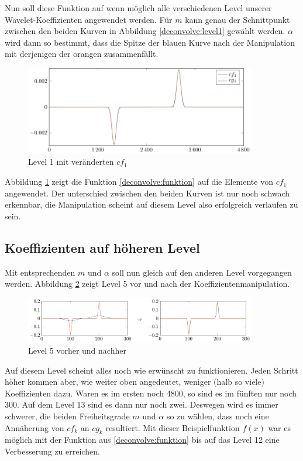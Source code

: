 Nun soll diese Funktion auf wenn möglich alle verschiedenen Level unserer Wavelet-Koeffizienten angewendet werden.
Für $m$ kann genau der Schnittpunkt zwischen den beiden Kurven in Abbildung \ref{deconvolve:level1} gewählt werden.
$\alpha$ wird dann so bestimmt, dass die Spitze der blauen Kurve nach der Manipulation mit derjenigen der orangen zusammenfällt.
\begin{figure}[h]
\centering
\includegraphics[width=0.9\textwidth]{./papers/deconvolve/pictures/level/level1_n.pdf}
\caption{Level 1 mit veränderten $cf_1$\label{deconvolve:level1_n}}
\end{figure}

Abbildung \ref{deconvolve:level1_n} zeigt die Funktion \eqref{deconvolve:funktion} auf die Elemente von $cf_1$ angewendet.
Der unterschied zwischen den beiden Kurven ist nur noch schwach erkennbar, die Manipulation scheint auf diesem Level also erfolgreich verlaufen zu sein.

\subsection{Koeffizienten auf höheren Level}

Mit entsprechenden $m$ und $\alpha$ soll nun gleich auf den anderen Level vorgegangen werden.
Abbildung \ref{deconvolve:level5} zeigt Level 5 vor und nach der Koeffizientenmanipulation.
\begin{figure}[h]
\centering
\includegraphics[width=0.9\textwidth]{./papers/deconvolve/pictures/level/level5.pdf}
\caption{Level 5 vorher und nachher\label{deconvolve:level5}}
\end{figure}

Auf diesem Level scheint alles noch wie erwünscht zu funktionieren.
Jeden Schritt höher kommen aber, wie weiter oben angedeutet, weniger (halb so viele) Koeffizienten dazu.
Waren es im ersten noch 4800, so sind es im fünften nur noch 300.
Auf dem Level 13 sind es dann nur noch zwei.
Deswegen wird es immer schwerer, die beiden Freiheitsgrade $m$ und $\alpha$ so zu wählen, dass noch eine Annäherung von $cf_k$ an $cg_k$ resultiert.
Mit dieser Beispielfunktion $f(x)$ war es möglich mit der Funktion aus \eqref{deconvolve:funktion} bis auf das Level 12 eine Verbesserung zu erreichen.

